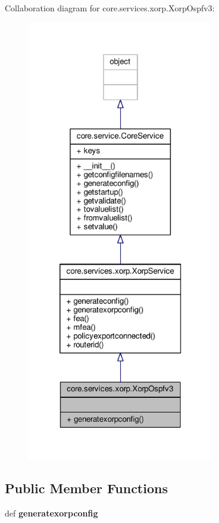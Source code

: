 Collaboration diagram for core.\+services.\+xorp.\+Xorp\+Ospfv3\+:
\nopagebreak
\begin{figure}[H]
\begin{center}
\leavevmode
\includegraphics[height=550pt]{classcore_1_1services_1_1xorp_1_1_xorp_ospfv3__coll__graph}
\end{center}
\end{figure}
\subsection*{Public Member Functions}
\begin{DoxyCompactItemize}
\item 
\hypertarget{classcore_1_1services_1_1xorp_1_1_xorp_ospfv3_ab91805ec86dfe2e270da1c156a62c1b3}{def {\bfseries generatexorpconfig}}\label{classcore_1_1services_1_1xorp_1_1_xorp_ospfv3_ab91805ec86dfe2e270da1c156a62c1b3}

\end{DoxyCompactItemize}
